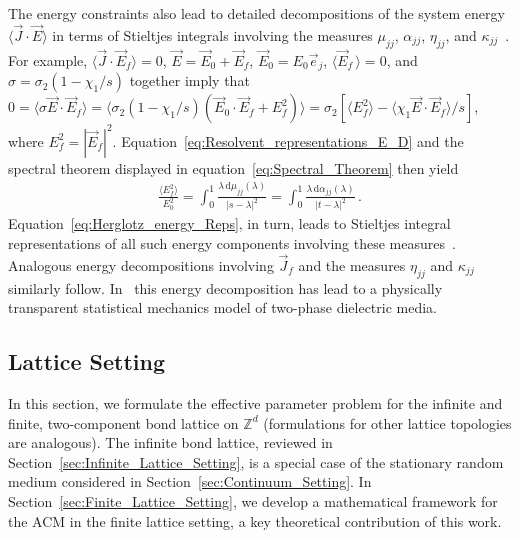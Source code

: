 \documentclass{cmslatex}
\renewcommand{\d}{\text{d}}
\begin{document}
The energy constraints also lead to detailed decompositions of the
system energy $\langle\vec{J}\cdot\vec{E}\rangle$ in terms of Stieltjes integrals
involving the measures $\mu_{jj}$, $\alpha_{jj}$, $\eta_{jj}$, and
$\kappa_{jj}$~\cite{Murphy:JMP:063506,Murphy:PHD_Thesis}. For  
example, $\langle\vec{J}\cdot\vec{E}_f\rangle=0$, $\vec{E}=\vec{E}_0+\vec{E}_f$, 
$\vec{E}_0=E_0\vec{e}_j$, $\langle\vec{E}_f\,\rangle=0$, and $\sigma=\sigma_2(1-\chi_1/s)$ together
imply that $0=\langle\sigma\vec{E}\cdot\vec{E}_f\rangle=\langle\sigma_2(1-\chi_1/s)(\vec{E}_0\cdot\vec{E}_f+E_f^2)\rangle 
=\sigma_2\left[\langle E_f^2\rangle-\langle\chi_1\vec{E}\cdot\vec{E}_f\rangle/s\right]$, where $E_f^2=|\vec{E}_f|^2$.
Equation~\eqref{eq:Resolvent_representations_E_D} and the spectral
theorem displayed in equation~\eqref{eq:Spectral_Theorem} then
yield~\cite{Murphy:JMP:063506}    
%
\begin{align}\label{eq:Herglotz_energy_Reps}
 \frac{\langle E_f^2\rangle}{E_0^2}=\int_0^1 \frac{\lambda\,\d\mu_{jj}(\lambda)}{|s-\lambda|^2}
           =\int_0^1 \frac{\lambda\,\d\alpha_{jj}(\lambda)}{|t-\lambda|^2}\,. 
\end{align}
%
Equation~\eqref{eq:Herglotz_energy_Reps}, in turn, leads to Stieltjes
integral representations of all such energy components involving
these measures~\cite{Murphy:PHD_Thesis}. Analogous energy
decompositions involving $\vec{J}_f$ and the measures $\eta_{jj}$ and
$\kappa_{jj}$ similarly follow. In~\cite{Murphy:PHD_Thesis} this
energy decomposition has lead to a physically transparent statistical
mechanics model of two-phase dielectric media.


\subsection{Lattice Setting}
\label{sec:Lattice_Setting}
%
In this section, we formulate the effective parameter problem for the
infinite and finite, two-component bond lattice on $\mathbb{Z}^d$
(formulations for other lattice topologies are analogous). The
infinite bond lattice, reviewed in
Section~\ref{sec:Infinite_Lattice_Setting}, is a special case of the
stationary random medium considered in
Section~\ref{sec:Continuum_Setting}. In
Section~\ref{sec:Finite_Lattice_Setting}, we develop a mathematical
framework for the ACM in the finite lattice setting, a key theoretical
contribution of this work. 
\end{document}
